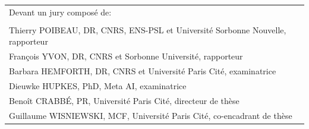 \documentclass[12pt,oneside]{book} %
\begin{document}
\begin{titlepage}
		\begin{center}
        \begin{tabular}{l}
        {\fontsize{14}{14}\selectfont Devant un jury composé de: }\\
        \\
        Thierry \textsc{POIBEAU}, \textsc{DR}, CNRS, ENS-PSL et Université Sorbonne Nouvelle, rapporteur \\
        François \textsc{YVON}, \textsc{DR}, CNRS et Sorbonne Université, rapporteur \\
        Barbara \textsc{HEMFORTH}, \textsc{DR}, CNRS et Université Paris Cité, examinatrice \\
        Dieuwke \textsc{HUPKES}, PhD, Meta AI, examinatrice  \\
        Benoît \textsc{CRABBÉ}, \textsc{PR}, Université Paris Cité, directeur de thèse \\
        Guillaume \textsc{WISNIEWSKI}, \textsc{MCF}, Université Paris Cité, co-encadrant de thèse
        \end{tabular}
         \end{center}
	\newpage
	\end{titlepage}
\pagestyle{fancy}

\fancyhead{}

\renewcommand{\chaptermark}[1]{\markboth{\textsc{#1}}{}}


\frontmatter


        
\clearpage %





\tableofcontents
\clearpage
\listoffigures
{}

\clearpage
\listoftables
{}


\mainmatter

\setlength{\parskip}{.7em}

\titlespacing*{\section}{0pt}{.9em}{.8em}
\renewcommand{\baselinestretch}{1.1}
\end{document}
